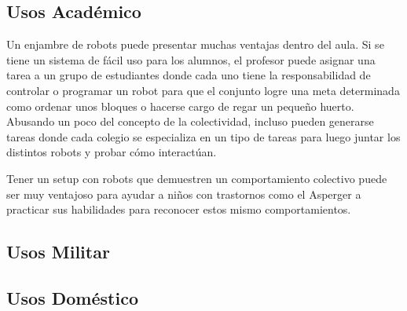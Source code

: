\subsection{Usos Académico}

Un enjambre de robots puede presentar muchas ventajas dentro del aula. Si se tiene un sistema de fácil uso para los alumnos, el profesor puede asignar una tarea a un grupo de estudiantes donde cada uno tiene la responsabilidad de controlar o programar un robot para que el conjunto logre una meta determinada como ordenar unos bloques o hacerse cargo de regar un pequeño huerto. Abusando un poco del concepto de la colectividad, incluso pueden generarse tareas donde cada colegio se especializa en un tipo de tareas para luego juntar los distintos robots y probar cómo interactúan.

Tener un setup con robots que demuestren un comportamiento colectivo puede ser muy ventajoso para ayudar a niños con trastornos como el Asperger a practicar sus habilidades para reconocer estos mismo comportamientos.

\subsection{Usos Militar}

\subsection{Usos Doméstico}
